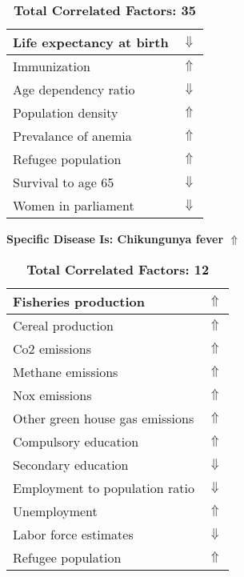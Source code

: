 \documentclass[12pt,notitlepage,oneside]{report}
\begin{document}
\begin{table}[!htb]
\begin{tabular}{|l|l|}
Life expectancy at birth & $\Downarrow$\\ \hline
Immunization & $\Uparrow$\\ \hline
Age dependency ratio & $\Downarrow$\\ \hline
Population density & $\Uparrow$\\ \hline
Prevalance of anemia & $\Uparrow$\\ \hline
Refugee population & $\Uparrow$\\ \hline
Survival to age 65 & $\Downarrow$\\ \hline
Women in parliament & $\Downarrow$\\ \hline
\end{tabular}
\caption*{\textbf{Total Correlated Factors: 35}}
\end{table}
\clearpage
\begin{table}[!htb]
\caption{\textbf{Specific Disease Is: Chikungunya fever $\Uparrow$}}
\centering
\label{Correlated Socio-economic Factors0}
\begin{tabular}{|l|l|}
\hline
Fisheries production & $\Uparrow$\\ \hline
Cereal production & $\Uparrow$\\ \hline
Co2 emissions & $\Uparrow$\\ \hline
Methane emissions & $\Uparrow$\\ \hline
Nox emissions & $\Uparrow$\\ \hline
Other green house gas emissions & $\Uparrow$\\ \hline
Compulsory education & $\Uparrow$\\ \hline
Secondary education & $\Downarrow$\\ \hline
Employment to population ratio & $\Downarrow$\\ \hline
Unemployment & $\Uparrow$\\ \hline
Labor force estimates & $\Downarrow$\\ \hline
Refugee population & $\Uparrow$\\ \hline
\end{tabular}
\caption*{\textbf{Total Correlated Factors: 12}}
\end{table}
\end{document}
